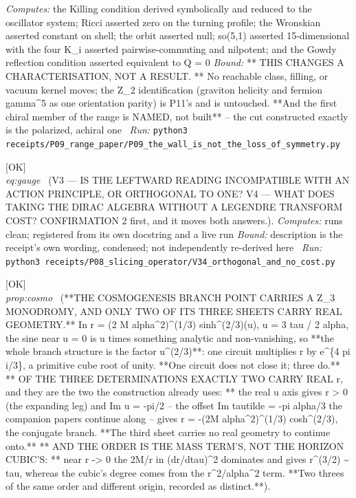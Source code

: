 \begin{description}
\emph{Computes:} the Killing condition derived symbolically and reduced to the oscillator system; Ricci asserted zero on the turning profile; the Wronskian asserted constant on shell; the orbit asserted null; so(5,1) asserted 15-dimensional with the four K\_i asserted pairwise-commuting and nilpotent; and the Gowdy reflection condition asserted equivalent to Q = 0
 \emph{Bound:} ** THIS CHANGES A CHARACTERISATION, NOT A RESULT. ** No reachable class, filling, or vacuum kernel moves; the Z\_2 identification (graviton helicity and fermion gamma\textasciicircum{}5 as one orientation parity) is P11's and is untouched. **And the first chiral member of the range is NAMED, not built** -- the cut constructed exactly is the polarized, achiral one
\ \emph{Run:} \texttt{python3 receipts/P09\_range\_paper/P09\_the\_wall\_is\_not\_the\_loss\_of\_symmetry.py}
\item[\label{rcpt:V34_orthogonal_and_no_cost}\texttt{V34\_orthogonal\_and\_no\_cost}]\hfill\textsf{[OK]}\\
\textit{eq:gauge} \ (V3 --- IS THE LEFTWARD READING INCOMPATIBLE WITH AN ACTION PRINCIPLE, OR ORTHOGONAL TO ONE? V4 --- WHAT DOES TAKING THE DIRAC ALGEBRA WITHOUT A LEGENDRE TRANSFORM COST? CONFIRMATION 2 first, and it moves both answers.). 
\emph{Computes:} runs clean; registered from its own docstring and a live run
 \emph{Bound:} description is the receipt's own wording, condensed; not independently re-derived here
\ \emph{Run:} \texttt{python3 receipts/P08\_slicing\_operator/V34\_orthogonal\_and\_no\_cost.py}
\item[\label{rcpt:P08_the_branch_point_monodromy_is_Z3}\texttt{P08\_the\_branch\_point\_monodromy\_is\_Z3}]\hfill\textsf{[OK]}\\
\textit{prop:cosmo} \ (**THE COSMOGENESIS BRANCH POINT CARRIES A Z\_3 MONODROMY, AND ONLY TWO OF ITS THREE SHEETS CARRY REAL GEOMETRY.** In r = (2 M alpha\textasciicircum{}2)\textasciicircum{}(1/3) sinh\textasciicircum{}(2/3)(u), u = 3 tau / 2 alpha, the sine near u = 0 is u times something analytic and non-vanishing, so **the whole branch structure is the factor u\textasciicircum{}(2/3)**: one circuit multiplies r by e\textasciicircum{}\{4 pi i/3\}, a primitive cube root of unity. **One circuit does not close it; three do.** ** OF THE THREE DETERMINATIONS EXACTLY TWO CARRY REAL r, and they are the two the construction already uses: ** the real u axis gives r > 0 (the expanding leg) and Im u = -pi/2 -- the offset Im tautilde = -pi alpha/3 the companion papers continue along -- gives r = -(2M alpha\textasciicircum{}2)\textasciicircum{}(1/3) cosh\textasciicircum{}(2/3), the conjugate branch. **The third sheet carries no real geometry to continue onto.** ** AND THE ORDER IS THE MASS TERM'S, NOT THE HORIZON CUBIC'S: ** near r -> 0 the 2M/r in (dr/dtau)\textasciicircum{}2 dominates and gives r\textasciicircum{}(3/2) \textasciitilde{} tau, whereas the cubic's degree comes from the r\textasciicircum{}2/alpha\textasciicircum{}2 term. **Two threes of the same order and different origin, recorded as distinct.**). 

\end{description}
